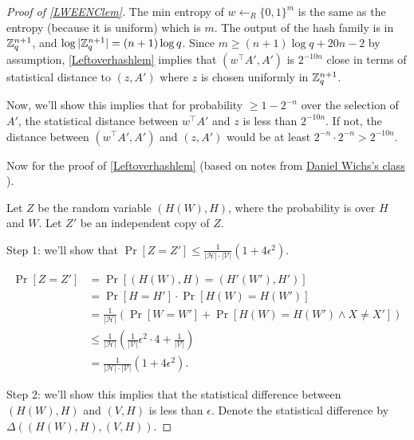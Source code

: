 \begin{proof}[Proof of \cref{LWEENClem}]
The min entropy of \(w\gets_R\{0,1\}^m\) is the same as the entropy
(because it is uniform) which is \(m\). The output of the hash family is
in \({\mathbb{Z}}_q^{n+1}\), and \(\log|{\mathbb{Z}}_q^{n+1}|=(n+1)\log q\). Since
\(m\ge(n+1)\log q+20n-2\) by assumption, \cref{Leftoverhashlem} implies
that \((w^\top A',A')\) is \(2^{-10n}\) close in terms of statistical
distance to \((z,A')\) where \(z\) is chosen uniformly in
\({\mathbb{Z}}_q^{n+1}\).

Now, we'll show this implies that for probability \(\ge 1-2^{-n}\) over
the selection of \(A'\), the statistical distance between \(w^\top A'\)
and \(z\) is less than \(2^{-10n}\). If not, the distance between
\((w^\top A',A')\) and \((z,A')\) would be at least
\(2^{-n}\cdot 2^{-n}>2^{-10n}\).

Now for the proof of \cref{Leftoverhashlem} (based on notes from
\href{http://www.ccs.neu.edu/home/wichs/class/crypto-fall15/}{Daniel
Wichs's class} \cite{wichsnotes}).

Let \(Z\) be the random variable \((H(W),H)\), where the probability is
over \(H\) and \(W\). Let \(Z'\) be an independent copy of \(Z\).

Step 1: we'll show that
\(\Pr[Z=Z']\le\frac{1}{|\mathcal{H}|\cdot|\mathcal{V}|}(1+4\epsilon^2)\).

\begin{equation*}
\begin{aligned} \Pr[Z=Z']&=\Pr[(H(W),H)=(H'(W'),H')]\\&=\Pr[H=H']\cdot\Pr[H(W)=H(W')]\\&=\frac{1}{|\mathcal{H}|}\left(\Pr[W=W']+\Pr[H(W)=H(W')\wedge X\neq X']\right)\\&\le\frac{1}{|\mathcal{H}|}\left(\frac{1}{|\mathcal{V}|}\epsilon^2\cdot 4+\frac{1}{|\mathcal{V}|}\right)\\&=\frac{1}{|\mathcal{H}|\cdot|\mathcal{V}|}(1+4\epsilon^2).\end{aligned}
\end{equation*}

Step 2: we'll show this implies that the statistical difference between
\((H(W),H)\) and \((V,H)\) is less than \(\epsilon\). Denote the
statistical difference by \(\Delta((H(W),H),(V,H))\).


\end{proof}
